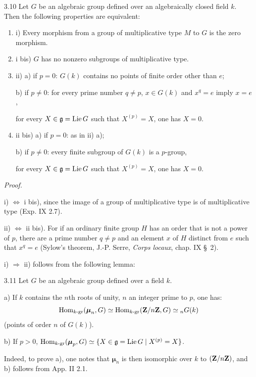 \begin{proposition}{3.10}\label{XVII.3.10}
Let $G$ be an algebraic group defined over an algebraically closed field $k$. Then the following properties are equivalent:
\begin{enumerate}[label={}]
\item i) Every morphism from a group of multiplicative type $M$ to $G$ is the zero morphism.
\item i bis) $G$ has no nonzero subgroups of multiplicative type.
\item ii) a) if $p=0$: $G(k)$ contains no points of finite order other than $e$;
\par b) if $p\neq0$: for every prime number $q\neq p$, $x\in G(k)$ and $x^q=e$ imply $x=e$,
\par for every $X\in\mathfrak g=\operatorname{Lie} G$ such that $X^{(p)}=X$, one has $X=0$.
\item ii bis) a) if $p=0$: as in ii) a);
\par b) if $p\neq0$: every finite subgroup of $G(k)$ is a $p$-group,
\par for every $X\in\mathfrak g=\operatorname{Lie} G$ such that $X^{(p)}=X$, one has $X=0$.
\end{enumerate}
\end{proposition}
\noindent\emph{Proof.}

\noindent i) $\Leftrightarrow$ i bis), since the image of a group of multiplicative type is of multiplicative type (Exp. IX 2.7).

\noindent ii) $\Leftrightarrow$ ii bis). For if an ordinary finite group $H$ has an order that is not a power of $p$, there are a prime number $q\neq p$ and an element $x$ of $H$ distinct from $e$ such that $x^q=e$ (Sylow's theorem, \cf J.-P. Serre, \emph{Corps locaux}, chap. IX \S~2).

\noindent i) $\Rightarrow$ ii) follows from the following lemma:
\begin{lemma}{3.11}\label{XVII.3.11}
Let $G$ be an algebraic group defined over a field $k$.

\noindent a) If $k$ contains the $n$th roots of unity, $n$ an integer prime to $p$, one has:
\[
 \operatorname{Hom}_{k\text{-gr}}(\boldsymbol\mu_n,G)\simeq
 \operatorname{Hom}_{k\text{-gr}}(\mathbf{Z}/n\mathbf{Z},G)\simeq{}_nG(k)
\]
(points of order $n$ of $G(k)$).

\noindent b) If $p>0$, $\operatorname{Hom}_{k\text{-gr}}(\boldsymbol\mu_p,G)\simeq\{X\in\mathfrak g=\operatorname{Lie} G\mid X^{(p)}=X\}$.
\end{lemma}
Indeed, to prove a), one notes that $\boldsymbol\mu_n$ is then isomorphic over $k$ to $(\mathbf{Z}/n\mathbf{Z})$, and b) follows from App. II 2.1.

